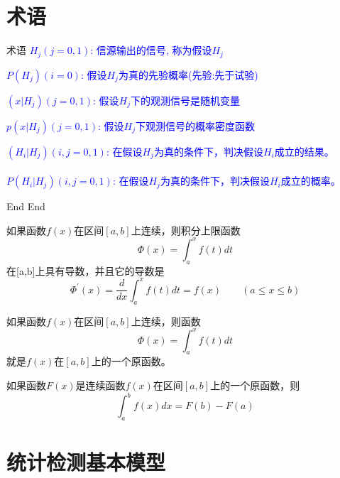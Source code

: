 \section{术语}

\begin{frame}{术语}
\textcolor{blue}{$H_j(j=0,1)$: 信源输出的信号, 称为假设$H_j$}

\bigskip

\textcolor{blue}{$P(H_j)(i=0)$: 假设$H_j$为真的先验概率(先验:先于试验)}


\bigskip
\textcolor{blue}{$(x|H_j)(j=0,1)$: 假设$H_j$下的观测信号是随机变量}

\bigskip

\textcolor{blue}{$p(x|H_j)(j=0,1)$: 假设$H_j$下观测信号的概率密度函数}

\bigskip

\textcolor{blue}{$(H_i|H_j)(i,j=0,1)$: 在假设$H_j$为真的条件下，判决假设$H_i$成立的结果。}\\
~\\
\textcolor{blue}{$P(H_i|H_j)(i,j=0,1)$: 在假设$H_j$为真的条件下，判决假设$H_i$成立的概率。}\\
\end{frame}

\begin{frame}{End}
End
\end{frame}

\begin{frame}
\begin{theorem}
	如果函数$f(x)$在区间$[a,b]$上连续，则积分上限函数
	\[\Phi(x)=\int_a^x f(t)dt\]
	在[a,b]上具有导数，并且它的导数是
	\[\Phi^\prime(x)=\frac{d}{dx}\int_a^xf(t)dt=f(x)\qquad (a\le x\le b) \]
\end{theorem}
\begin{theorem}
	如果函数$f(x)$在区间$[a,b]$上连续，则函数
	\[\Phi(x)=\int_a^x f(t)dt\]	
	就是$f(x)$在$[a,b]$上的一个原函数。
\end{theorem}
\end{frame}

\begin{frame}
\begin{theorem}
	如果函数$F(x)$是连续函数$f(x)$在区间$[a,b]$上的一个原函数，则
	\[\int_a^b f(x)dx=F(b)-F(a)\]	
\end{theorem}
\end{frame}

\section{统计检测基本模型}

